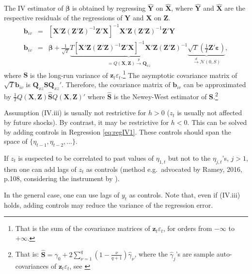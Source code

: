 \documentclass[
  12pt,
]{book}
\theoremstyle{definition}
\theoremstyle{definition}
\theoremstyle{definition}
\theoremstyle{definition}
\theoremstyle{remark}
\begin{document}
The IV estimator of \(\boldsymbol\beta\) is obtained by regressing \(\hat{\mathbf{Y}}\) on \(\hat{\mathbf{X}}\), where \(\hat{\mathbf{Y}}\) and \(\hat{\mathbf{X}}\) are the respective residuals of the regressions of \(\mathbf{Y}\) and \(\mathbf{X}\) on \(\mathbf{Z}\).
\begin{eqnarray*}
\mathbf{b}_{iv} &=& [\mathbf{X}'\mathbf{Z}(\mathbf{Z}'\mathbf{Z})^{-1}\mathbf{Z}'\mathbf{X}]^{-1}\mathbf{X}'\mathbf{Z}(\mathbf{Z}'\mathbf{Z})^{-1}\mathbf{Z}'\mathbf{Y}\\
\mathbf{b}_{iv} &=& \boldsymbol\beta + \frac{1}{\sqrt{T}}\underbrace{T[\mathbf{X}'\mathbf{Z}(\mathbf{Z}'\mathbf{Z})^{-1}\mathbf{Z}'\mathbf{X}]^{-1}\mathbf{X}'\mathbf{Z}(\mathbf{Z}'\mathbf{Z})^{-1}}_{=Q(\mathbf{X},\mathbf{Z}) \overset{p}{\rightarrow} \mathbf{Q}_{xz}}\underbrace{\sqrt{T}\left(\frac{1}{T}\mathbf{Z}'\boldsymbol\varepsilon\right)}_{\overset{d}{\rightarrow} \mathcal{N}(0,S)},
\end{eqnarray*}
where \(\mathbf{S}\) is the long-run variance of \(\mathbf{z}_t\varepsilon_t\).\footnote{That is the sum of the covariance matrices of \(\mathbf{z}_t\varepsilon_t\), for orders from \(-\infty\) to \(+\infty\).} The asymptotic covariance matrix of \(\sqrt{T}\mathbf{b}_{iv}\) is \(\mathbf{Q}_{xz} \mathbf{S} \mathbf{Q}_{xz}'\). Therefore, the covariance matrix of \(\mathbf{b}_{iv}\) can be approximated by \(\frac{1}{T}Q(\mathbf{X},\mathbf{Z})\hat{\mathbf{S}}Q(\mathbf{X},\mathbf{Z})'\) where \(\hat{\mathbf{S}}\) is the Newey-West estimator of \(\mathbf{S}\).\footnote{That is: \(\hat{\mathbf{S}}=\hat\gamma_0 + 2 \sum_{\nu=1}^{q}\left(1-\frac{\nu}{q+1}\right) \hat\gamma_\nu\), where the \(\hat\gamma_j\)'s are sample auto-covariances of \(\mathbf{z}_t\varepsilon_t\), see \citet{Newey_West_1987}}

Assumption (IV.iii) is usually not restrictive for \(h>0\) (\(z_t\) is usually not affected by future shocks). By contrast, it may be restrictive for \(h<0\). This can be solved by adding controls in Regression \eqref{eq:regIV1}. These controls should span the space of \(\{\eta_{t-1},\eta_{t-2},\dots\}\).

If \(z_t\) is suspected to be correlated to past values of \(\eta_{1,t}\) but not to the \(\eta_{j,t}\)'s, \(j>1\), then one can add lags of \(z_t\) as controls (method e.g.~advocated by Ramey, 2016, p.108, considering the instrument by \citet{Gertler_Karadi_2015}).

In the general case, one can use lags of \(y_t\) as controls. Note that, even if (IV.iii) holds, adding controls may reduce the variance of the regression error.
\end{document}
